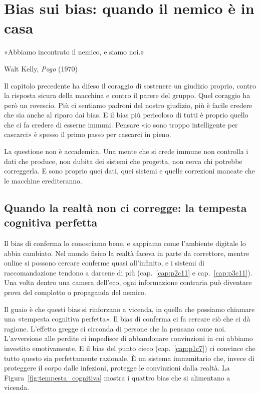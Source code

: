 
\chapter{Bias sui bias: quando il nemico è in casa}
\label{cap:p4c25}

\epigraph{«Abbiamo incontrato il nemico, e siamo noi.»}{Walt Kelly, \textit{Pogo} (1970)}

Il capitolo precedente ha difeso il coraggio di sostenere un giudizio proprio, contro la risposta sicura della macchina e contro il parere del gruppo. Quel coraggio ha però un rovescio. Più ci sentiamo padroni del nostro giudizio, più è facile credere che sia anche al riparo dai bias. E il bias più pericoloso di tutti è proprio quello che ci fa credere di esserne immuni. Pensare «io sono troppo intelligente per cascarci» è spesso il primo passo per cascarci in pieno.

La questione non è accademica. Una mente che si crede immune non controlla i dati che produce, non dubita dei sistemi che progetta, non cerca chi potrebbe correggerla. E sono proprio quei dati, quei sistemi e quelle correzioni mancate che le macchine erediteranno.

\bigskip

\section{Quando la realtà non ci corregge: la tempesta cognitiva perfetta}
\label{sec:p4c25-quando-la-realta}

Il bias di conferma lo conosciamo bene, e sappiamo come l'ambiente digitale lo abbia cambiato. Nel mondo fisico la realtà faceva in parte da correttore, mentre online si possono cercare conferme quasi all'infinito, e i sistemi di raccomandazione tendono a darcene di più (cap.~\ref{cap:p2c11} e cap.~\ref{cap:p3c11}). Una volta dentro una camera dell'eco, ogni informazione contraria può diventare prova del complotto o propaganda del nemico.

Il guaio è che questi bias si rinforzano a vicenda, in quella che possiamo chiamare una «tempesta cognitiva perfetta». Il bias di conferma ci fa cercare ciò che ci dà ragione. L'effetto gregge ci circonda di persone che la pensano come noi. L'avversione alle perdite ci impedisce di abbandonare convinzioni in cui abbiamo investito emotivamente. E il bias del punto cieco (cap.~\ref{cap:p1c7}) ci convince che tutto questo sia perfettamente razionale. È un sistema immunitario che, invece di proteggere il corpo dalle infezioni, protegge le convinzioni dalla realtà. La Figura~\ref{fig:tempesta_cognitiva} mostra i quattro bias che si alimentano a vicenda.

